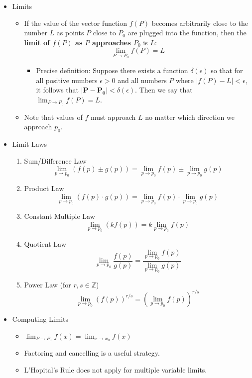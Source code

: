 \documentclass[12pt]{article}
\newcommand{\ds}{\displaystyle}
\renewcommand{\vec}[1]{\mathbf{#1}}
\newcommand{\<}{\left<}
\renewcommand{\>}{\right>}
\begin{document}
\begin{itemize}

  \item Limits
    \begin{itemize}
      \item If the value of the vector function $f(P)$ becomes arbitrarily close to the number $L$ as points $P$ close to $P_0$ are plugged into the function, then the \textbf{limit of $f(P)$ as $P$ approaches $P_0$} is $L$: \[\lim_{P\to P_0} f(P) = L\]
        \begin{itemize}
          \item Precise definition: \newline
          Suppose there exists a function $\delta(\epsilon)$ so that for all positive numbers $\epsilon>0$ and all numbers $P$ where $|f(P)-L|<\epsilon$, it follows that $|\vec{P}-\vec{P_0}|<\delta(\epsilon)$. Then we say that $\lim_{P\to P_0} f(P) = L$.
        \end{itemize}
      \item Note that values of $f$ must approach $L$ no matter which direction we approach $p_0$.
    \end{itemize}
    
  \item Limit Laws
  
    \begin{enumerate}
      \item Sum/Difference Law \[\lim_{p\to p_0}(f(p)\pm g(p)) = \lim_{p\to p_0}f(p) \pm \lim_{p\to p_0}g(p)\]
      \item Product Law \[\lim_{p\to p_0}(f(p)\cdot g(p)) = \lim_{p\to p_0}f(p) \cdot \lim_{p\to p_0}g(p)\]
      \item Constant Multiple Law \[\lim_{p\to p_0}(kf(p)) = k\lim_{p\to p_0}f(p)\]
      \item Quotient Law \[\lim_{p\to p_0}\frac{f(p)}{g(p)} = \frac{\ds \lim_{p\to p_0}f(p)}{\ds \lim_{p\to p_0}g(p)}\]
      \item Power Law (for $r,s\in \mathbb{Z}$) \[\lim_{p\to p_0}(f(p))^{r/s} = \left(\lim_{p\to p_0}f(p)\right)^{r/s}\]
    \end{enumerate}

  \newpage
          
  \item Computing Limits
    
      \begin{itemize}
      \item $\ds \lim_{P \to P_0} f(x) = \lim_{x\to x_0} f(x)$
      \item Factoring and cancelling is a useful strategy.
      \item L'Hopital's Rule does not apply for multiple variable limits.
      \end{itemize}
  

\end{itemize}
\end{document}
